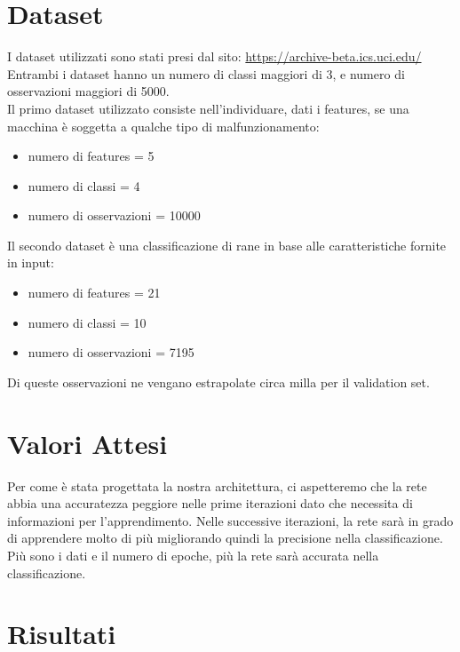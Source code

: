 \documentclass{article}
\begin{document}
    \section{Dataset}\label{sec:dataset}
        I dataset utilizzati sono stati presi dal sito: \href{https://archive-beta.ics.uci.edu/}{https://archive-beta.ics.uci.edu/} \\
        Entrambi i dataset hanno un numero di classi maggiori di 3, e numero di osservazioni maggiori di 5000. \\
        Il primo dataset utilizzato consiste nell'individuare, dati i features, se una macchina è soggetta a qualche tipo di malfunzionamento:
        \begin{itemize}
            \item numero di features = 5
            \item numero di classi = 4
            \item numero di osservazioni = 10000
        \end{itemize}
        Il secondo dataset è una classificazione di rane in base alle caratteristiche fornite in input:
        \begin{itemize}
            \item numero di features = 21
            \item numero di classi = 10
            \item numero di osservazioni = 7195
        \end{itemize}
        Di queste osservazioni ne vengano estrapolate circa milla per il validation set.
    \section{Valori Attesi}\label{sec:valori-attesi}
        Per come è stata progettata la nostra architettura, ci aspetteremo che la rete abbia una accuratezza peggiore nelle prime iterazioni dato che necessita di informazioni per l'apprendimento.
        Nelle successive iterazioni, la rete sarà in grado di apprendere molto di più migliorando quindi la precisione nella classificazione.
        Più sono i dati e il numero di epoche, più la rete sarà accurata nella classificazione.
    \section{Risultati}\label{sec:risultati}
\end{document}
